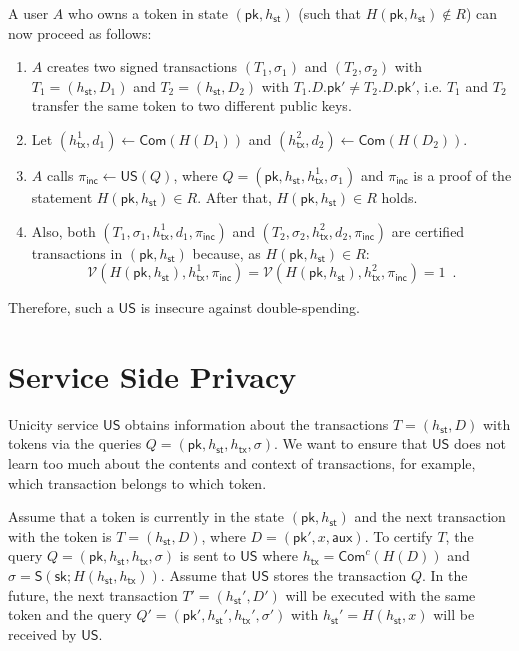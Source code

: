 \documentclass{article}
\newcommand{\sig}[0]{\mathsf{S}}
\newcommand{\pubkey}[0]{\mathsf{pk}}
\newcommand{\prikey}[0]{\mathsf{sk}}
\newcommand{\commit}[0]{\mathsf{Com}}
\newcommand{\commitc}[0]{\mathsf{Com}^{c}}
\newcommand{\unisrv}[0]{\mathsf{US}}
\newcommand{\sthash}[0]{h_\mathsf{st}}
\newcommand{\txhash}[0]{h_\mathsf{tx}}
\newcommand{\univer}[0]{\mathcal{V}}
\newcommand{\pinc}[0]{\pi_{\mathsf{inc}}}
\begin{document}
\noindent A user $A$ who owns a token in state $(\pubkey,\sthash)$ (such that $H(\pubkey,\sthash)\not\in R$) can now proceed as follows:
\begin{enumerate}
\item $A$ creates two signed transactions $(T_1,\sigma_1)$ and $(T_2,\sigma_2)$ with
$T_1=(\sthash,D_1)$ and $T_2=(\sthash,D_2)$ with $T_1.D.\pubkey'\neq T_2.D.\pubkey'$, i.e. $T_1$ and $T_2$ transfer the same token to two different public keys.
\item Let $(\txhash^1,d_1)\gets \commit(H(D_1))$ and $(\txhash^2,d_2)\gets \commit(H(D_2))$.
\item $A$ calls $\pinc\gets\unisrv(Q)$, where $Q=(\pubkey,\sthash,\txhash^1,\sigma_1)$ and $\pinc$ is a proof of the statement $H(\pubkey,\sthash)\in R$. After that, $H(\pubkey,\sthash)\in R$ holds.
\item Also, both $(T_1,\sigma_1,\txhash^1,d_1, \pinc)$ and $(T_2,\sigma_2,\txhash^2,d_2, \pinc)$ are certified transactions in $(\pubkey,\sthash)$ because, as $H(\pubkey,\sthash)\in R$:
\[
\univer(H(\pubkey,\sthash),\txhash^1,\pinc)=
\univer(H(\pubkey,\sthash),\txhash^2,\pinc)=1\enspace.
\]
\end{enumerate}

\noindent Therefore, such a $\unisrv$ is insecure against double-spending.

\section{Service Side Privacy}

Unicity service $\unisrv$ obtains information about the transactions $T=(\sthash,D)$ with tokens via the queries $Q=(\pubkey, \sthash, \txhash,\sigma)$. We want to ensure that $\unisrv$ does not learn too much about the contents and context of transactions, for example, which transaction belongs to which token.

Assume that a token is currently in the state $(\pubkey,\sthash)$ and the next transaction with the token is $T=(\sthash, D)$, where $D=(\pubkey',x,\mathsf{aux})$. To certify $T$, the query
$Q=(\pubkey,\sthash,\txhash,\sigma)$ is sent to $\unisrv$ where $\txhash=\commitc(H(D))$ and $\sigma = \sig(\prikey; H(\sthash,\txhash))$.
Assume that $\unisrv$ stores the transaction $Q$.
In the future, the next transaction $T'=(\sthash',D')$ will be executed with the same token and the query
$Q'=(\pubkey',\sthash',\txhash',\sigma')$ with $\sthash'=H(\sthash,x)$ will be received by $\unisrv$.
\end{document}
